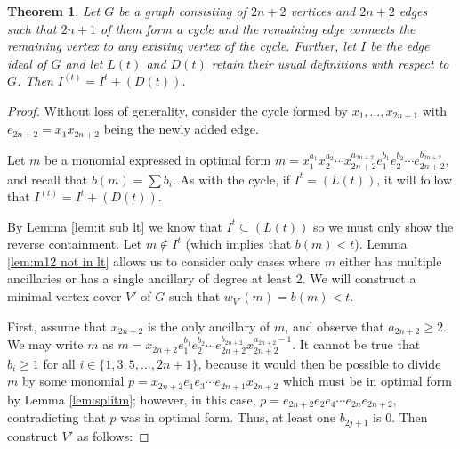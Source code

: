 \documentclass[12pt]{amsart}
\renewcommand{\geq}{\geqslant}
\renewcommand{\ge}{\geqslant}
\renewcommand{\leq}{\leqslant}
\renewcommand{\le}{\leqslant}
\theoremstyle{plain}
\newtheorem{theorem}{Theorem}[section]
\theoremstyle{definition}
\begin{document}
\begin{theorem}
Let $G$ be a graph consisting of $2n+2$ vertices and $2n+2$ edges such that $2n+1$ of them form a cycle and the remaining edge connects the remaining vertex to any existing vertex of the cycle. Further, let $I$ be the edge ideal of $G$ and let $L(t)$ and $D(t)$ retain their usual definitions with respect to $G$. Then $I^{(t)} = I^t + (D(t))$.
\end{theorem}
\begin{proof}
Without loss of generality, consider the cycle formed by $x_1, \ldots, x_{2n+1}$ with $e_{2n+2} = x_1 x_{2n+2}$ being the newly added edge. %

Let $m$ be a monomial expressed in optimal form $m = x_1^{a_1} x_2^{a_2} \cdots x_{2n+2}^{a_{2n+2}} e_1^{b_1} e_2^{b_2} \cdots e_{2n+2}^{b_{2n+2}}$, and recall that $b(m) = \sum b_i$.
As with the cycle, if $I^t = (L(t))$, it will follow that $I^{(t)} = I^t + (D(t))$.



By Lemma \ref{lem:it sub lt} we know that $I^t \subseteq (L(t))$ so we must only show the reverse containment. Let $m\not\in I^t$ (which implies that $b(m) < t$). %
Lemma \ref{lem:m12 not in lt} allows us to consider only cases where $m$ either has multiple ancillaries or has a single ancillary of degree at least 2.
We will construct a minimal vertex cover $V'$ of $G$ such that $w_{V'}(m) = b(m) < t$.


First, assume that $x_{2n+2}$ is the only ancillary of $m$, and observe that $a_{2n+2} \ge 2$. 
We may write $m$ as $m = x_{2n+2} e_1^{b_1} e_2^{b_2} \cdots e_{2n+2}^{b_{2n+2}} x_{2n+2}^{a_{2n+2} - 1}$. 
It cannot be true that $b_{i} \geq 1$ for all $i\in \{1,3,5,\ldots, 2n+1\}$, because it would then be possible to divide $m$ by some monomial $p = x_{2n+2} e_1 e_3\cdots e_{2n+1} x_{2n+2}$ which must be in optimal form by Lemma \ref{lem:splitm}; however, in this case, $p = e_{2n+2} e_2 e_4 \cdots e_{2n} e_{2n+2}$, contradicting that $p$ was in optimal form. 
Thus, at least one $b_{2j+1}$ is 0.
Then construct $V'$ as follows:


\end{proof}
\end{document}
